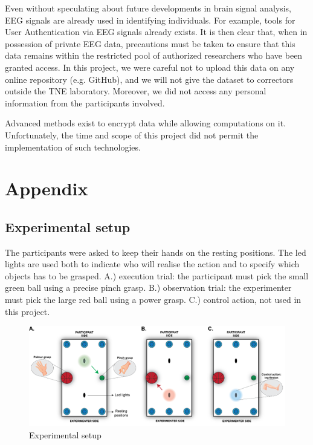 \documentclass[10pt,conference,compsocconf]{IEEEtran}
\begin{document}
Even without speculating about future developments in brain signal analysis, EEG signals are already used in identifying individuals. For example, tools for User Authentication via EEG signals already exists\cite{10058960}. It is then clear that, when in possession of private EEG data, precautions must be taken to ensure that this data remains within the restricted pool of authorized researchers who have been granted access. In this project, we were careful not to upload this data on any online repository (e.g. GitHub), and we will not give the dataset to correctors outside the TNE laboratory. Moreover, we did not access any personal information from the participants involved.

Advanced methods exist to encrypt data while allowing computations on it\cite{app11167360}. Unfortunately, the time and scope of this project did not permit the implementation of such technologies.

\section{Appendix}
\subsection{Experimental setup}
The participants were asked to keep their hands on the resting positions. The led lights are used both to indicate who will realise the action and to specify which objects has to be grasped. A.) execution trial: the participant must pick the small green ball using a precise pinch grasp. B.) observation trial: the experimenter must pick the large red ball using a power grasp. C.) control action, not used in this project.

\begin{figure}[h!]
    \center
    \includegraphics[width=\linewidth]{images/2024-12-11-13-41-23.png}
    \caption{Experimental setup}
\end{figure}
\FloatBarrier
\end{document}
